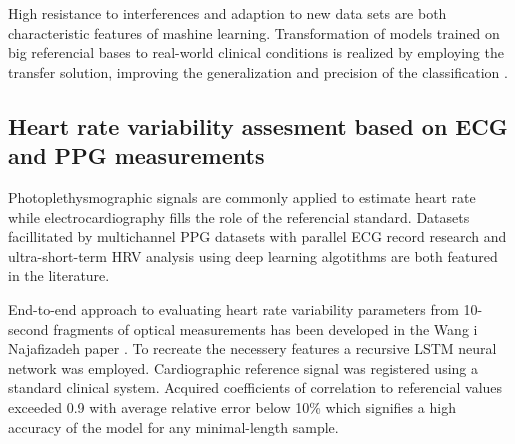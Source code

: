\documentclass[journal]{IEEEtran}
\begin{document}
{High resistance to interferences and adaption to new data sets are both characteristic features of mashine learning. Transformation of models trained on big referencial bases to real-world clinical conditions is realized by employing the transfer solution, improving the generalization and precision of the classification \cite{16}.

\subsection{Heart rate variability assesment based on ECG and PPG measurements}
Photoplethysmographic signals are commonly applied to estimate heart rate while electrocardiography fills the role of the referencial standard. Datasets facillitated by multichannel PPG datasets with parallel ECG record research and ultra-short-term HRV analysis using deep learning algotithms are both featured in the literature.

End-to-end approach to evaluating heart rate variability parameters from 10-second fragments of optical measurements has been developed in the Wang i Najafizadeh paper \cite{17}. To recreate the necessery features a recursive LSTM neural network was employed. Cardiographic reference signal was registered using a standard clinical system. Acquired coefficients of correlation to referencial values exceeded 0.9 with average relative error below 10\% which signifies a high accuracy of the model for any minimal-length sample.

}
\end{document}
